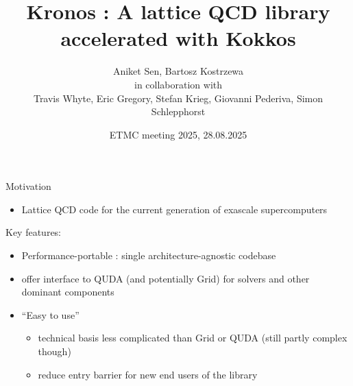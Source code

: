 
\graphicspath{{graphics/}}

\title[Kronos]{Kronos : A lattice QCD library accelerated with Kokkos}
\author[A. Sen, B. Kostrzewa]{Aniket Sen, Bartosz Kostrzewa  \\ \vspace{0.2cm} in collaboration with \\ \vspace{0.2cm} \centering Travis Whyte, Eric Gregory, Stefan Krieg, Giovanni Pederiva, Simon Schlepphorst}
\date[ETMC meeting 2025]{\small ETMC meeting 2025, 28.08.2025}
\subject{subject}




\begin{frame}
  \titlepage{}
\end{frame}


\begin{frame}{Motivation}
  \begin{itemize}
    \item Lattice QCD code for the current generation of exascale supercomputers
  \end{itemize} 
  \vspace{0.5cm}
  Key features: \\
  \begin{itemize}
    \item Performance-portable : single architecture-agnostic codebase
    \vspace{0.6cm}
    \item offer interface to QUDA (and potentially Grid) for solvers and other dominant components
    \vspace{0.6cm}
    \item ``Easy to use''
    \begin{itemize}
      \item technical basis less complicated than Grid or QUDA (still partly complex though)
      \vspace{0.6cm}
      \item reduce entry barrier for new end users of the library
    \end{itemize}
  \end{itemize}
\end{frame}

